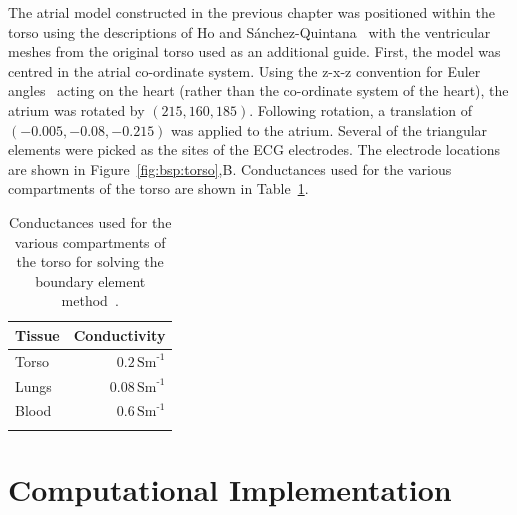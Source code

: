 The atrial model constructed in the previous chapter was positioned within the
torso using the descriptions of Ho and S\'{a}nchez-Quintana~\cite{Ho2009}
with the ventricular meshes from the original torso used as an additional guide.
First, the model was centred in the atrial co-ordinate system.
Using the z-x-z convention for Euler angles~\cite{eulerref} acting on the heart
(rather than the co-ordinate system of the heart), the atrium was rotated by
$\left(215, 160, 185\right)$.
Following rotation, a translation of $\left(-0.005, -0.08, -0.215\right)$ was
applied to the atrium.
Several of the triangular elements were picked as the sites of the ECG
electrodes.
The electrode locations are shown in Figure~\ref{fig:bsp:torso},B.
Conductances used for the various compartments of the torso are shown in
Table~\ref{tbl:bsp:conductances}.
\begin{table}[h]
    \caption[Conductances of torso compartments]{
        Conductances used for the various compartments of the torso for solving
        the boundary element method~\cite{Seger2004}.
    }
    \begin{tabular}{l r}
     \toprule
     Tissue & Conductivity \\
     \midrule
     Torso & $0.2\,\text{Sm}^{\text{-1}}$ \\
     Lungs & $0.08\,\text{Sm}^{\text{-1}}$ \\
     Blood & $0.6\,\text{Sm}^{\text{-1}}$ \\
     \bottomrule
     \label{tbl:bsp:conductances}
    \end{tabular}
\end{table}

\section{Computational Implementation}

